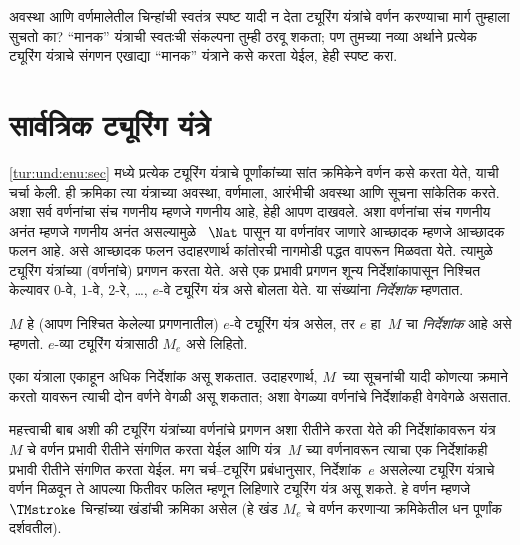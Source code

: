\begin{prob}
  अवस्था आणि वर्णमालेतील चिन्हांची स्वतंत्र
  स्पष्ट यादी न देता ट्यूरिंग यंत्रांचे वर्णन
  करण्याचा मार्ग तुम्हाला सुचतो का? “मानक”
  यंत्राची स्वतःची संकल्पना तुम्ही ठरवू शकता;
  पण तुमच्या नव्या अर्थाने प्रत्येक ट्यूरिंग
  यंत्राचे संगणन एखाद्या “मानक” यंत्राने
  कसे करता येईल, हेही स्पष्ट करा.
\end{prob}











\section{सार्वत्रिक ट्यूरिंग यंत्रे}\label{tur:und:uni:sec}

\ref{tur:und:enu:sec} मध्ये प्रत्येक ट्यूरिंग यंत्राचे
पूर्णांकांच्या सांत क्रमिकेने वर्णन कसे करता येते,
याची चर्चा केली. ही क्रमिका त्या यंत्राच्या अवस्था,
वर्णमाला, आरंभीची अवस्था आणि सूचना सांकेतिक करते.
अशा सर्व वर्णनांचा संच गणनीय म्हणजे गणनीय
आहे, हेही आपण दाखवले. अशा वर्णनांचा संच
गणनीय अनंत म्हणजे गणनीय अनंत असल्यामुळे
~$\Nat$ पासून या वर्णनांवर जाणारे
आच्छादक म्हणजे आच्छादक फलन आहे.
असे आच्छादक फलन उदाहरणार्थ कांतोरची
नागमोडी पद्धत वापरून मिळवता येते. त्यामुळे
ट्यूरिंग यंत्रांच्या (वर्णनांचे) प्रगणन करता येते.
असे एक प्रभावी प्रगणन शून्य निर्देशांकापासून निश्चित केल्यावर $0$-वे, $1$-वे,
$2$-रे, \dots, $e$-वे ट्यूरिंग यंत्र असे
बोलता येते. या संख्यांना \emph{निर्देशांक} म्हणतात.


\begin{defn}
$M$ हे (आपण निश्चित केलेल्या प्रगणनातील)
$e$-वे ट्यूरिंग यंत्र असेल, तर $e$ हा~$M$ चा
\emph{निर्देशांक} आहे असे म्हणतो. $e$-व्या
ट्यूरिंग यंत्रासाठी $M_e$ असे लिहितो.
\end{defn}

एका यंत्राला एकाहून अधिक निर्देशांक असू शकतात.
उदाहरणार्थ, $M$~च्या सूचनांची यादी कोणत्या
क्रमाने करतो यावरून त्याची दोन वर्णने वेगळी
असू शकतात; अशा वेगळ्या वर्णनांचे निर्देशांकही
वेगवेगळे असतात.

महत्त्वाची बाब अशी की ट्यूरिंग यंत्रांच्या वर्णनांचे
प्रगणन अशा रीतीने करता येते की निर्देशांकावरून
यंत्र~$M$ चे वर्णन प्रभावी रीतीने संगणित करता
येईल आणि यंत्र~$M$ च्या वर्णनावरून त्याचा
एक निर्देशांकही प्रभावी रीतीने संगणित करता
येईल. मग चर्च--ट्यूरिंग प्रबंधानुसार, निर्देशांक~$e$
असलेल्या ट्यूरिंग यंत्राचे वर्णन मिळवून ते
आपल्या फितीवर फलित म्हणून लिहिणारे ट्यूरिंग
यंत्र असू शकते. हे वर्णन म्हणजे
~$\TMstroke$ चिन्हांच्या खंडांची क्रमिका असेल
(हे खंड $M_e$ चे वर्णन करणाऱ्या क्रमिकेतील
धन पूर्णांक दर्शवतील).

